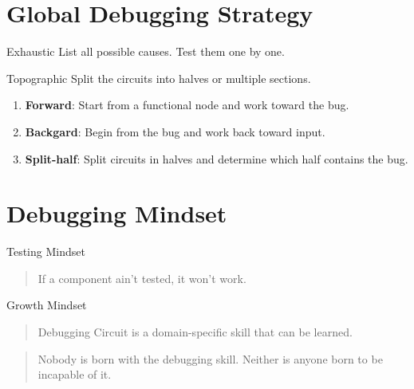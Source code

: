 \section{Global Debugging Strategy}

\begin{myblock}{Exhaustic}
    List all possible causes. 
    Test them one by one.
\end{myblock}

\begin{myblock}{Topographic}
    Split the circuits into halves or multiple sections.
    \begin{enumerate}
        \item \textbf{Forward}: Start from a functional node and work toward the bug.
        \item \textbf{Backgard}: Begin from the bug and work back toward input.
        \item \textbf{Split-half}: Split circuits in halves and determine which half contains the bug.
    \end{enumerate}
\end{myblock}

\section{Debugging Mindset}

\begin{alerttextbox}{Testing Mindset}
    \begin{quote}
        If a component ain't tested, it won't work.
    \end{quote}
\end{alerttextbox}

\begin{alerttextbox}{Growth Mindset}
    \begin{quote}
        Debugging Circuit is a domain-specific skill that can be learned.
    \end{quote}

    \begin{quote}
        Nobody is born with the debugging skill. Neither is anyone born to be incapable of it. 
    \end{quote}


    
\end{alerttextbox}

